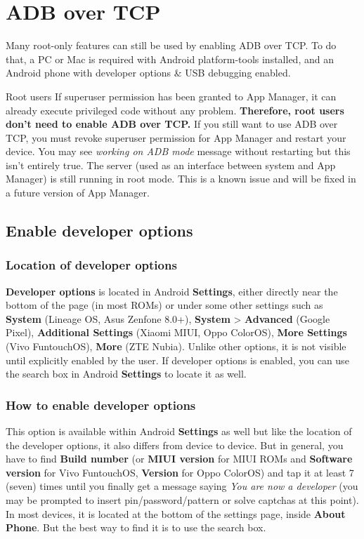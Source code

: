 \section{ADB over TCP}\label{sec:adb-over-tcp}
Many root-only features can still be used by enabling ADB over TCP. To do that, a PC or Mac is required with Android
platform-tools installed, and an Android phone with developer options \& USB debugging enabled.

\begin{tip}{Root users}
    If superuser permission has been granted to App Manager, it can already execute privileged code without any problem.
    \textbf{Therefore, root users don't need to enable ADB over TCP.} If you still want to use ADB over TCP, you must
    revoke superuser permission for App Manager and restart your device. You may see \textit{working on ADB mode}
    message without restarting but this isn't entirely true. The server (used as an interface between system and App
    Manager) is still running in root mode. This is a known issue and will be fixed in a future version of App Manager.
\end{tip}


\subsection{Enable developer options}\label{subsec:enable-developer-options}

\subsubsection{Location of developer options}\label{subsubsec:location-of-developer-options}
\textbf{Developer options} is located in Android \textbf{Settings}, either directly near the bottom of the page (in most
ROMs) or under some other settings such as \textbf{System} (Lineage OS, Asus Zenfone 8.0+), \textbf{System} >
\textbf{Advanced} (Google Pixel), \textbf{Additional Settings} (Xiaomi MIUI, Oppo ColorOS), \textbf{More Settings} (Vivo
FuntouchOS), \textbf{More} (ZTE Nubia). Unlike other options, it is not visible until explicitly enabled by the user. If
developer options is enabled, you can use the search box in Android \textbf{Settings} to locate it as well.

\subsubsection{How to enable developer options}
This option is available within Android \textbf{Settings} as well but like the location of the developer options, it
also differs from device to device. But in general, you have to find \textbf{Build number} (or \textbf{MIUI version} for
MIUI ROMs and \textbf{Software version} for Vivo FuntouchOS, \textbf{Version} for Oppo ColorOS) and tap it at least 7
(seven) times until you finally get a message saying \textit{You are now a developer} (you may be prompted to insert
pin/password/pattern or solve captchas at this point). In most devices, it is located at the bottom of the settings
page, inside \textbf{About Phone}. But the best way to find it is to use the search box.

